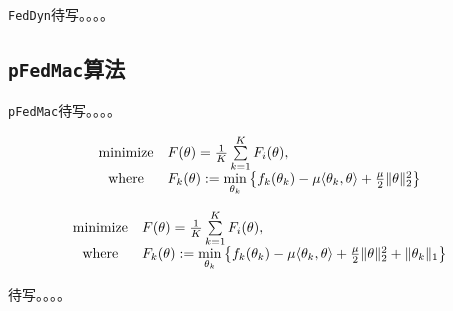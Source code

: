 

\texttt{FedDyn}待写。。。。






\subsection*{\texttt{pFedMac}算法}

\parencite{li2021pfedmac}  \texttt{pFedMac}待写。。。。

\begin{equation}
\label{eq:pfedmac}
\begin{array}{cl}
\operatorname*{minimize} & F(\theta) = \frac{1}{K} \sum\limits_{k=1}^K F_i(\theta), \\
\text{where} & F_k(\theta) := \mathop{\rm min}\limits_{\theta_k} \left\{ f_k(\theta_k) - \mu \langle \theta_k, \theta \rangle + \frac{\mu}{2} \lVert \theta \rVert^2_2 \right\}
\end{array}
\end{equation}

\begin{equation}
\label{eq:pfedmac-sparse}
\begin{array}{cl}
\operatorname*{minimize} & F(\theta) = \frac{1}{K} \sum\limits_{k=1}^K F_i(\theta), \\
\text{where} & F_k(\theta) := \mathop{\rm min}\limits_{\theta_k} \left\{ f_k(\theta_k) - \mu \langle \theta_k, \theta \rangle + \frac{\mu}{2} \lVert \theta \rVert^2_2 + \lVert \theta_k \rVert_1 \right\}
\end{array}
\end{equation}



待写。。。。
